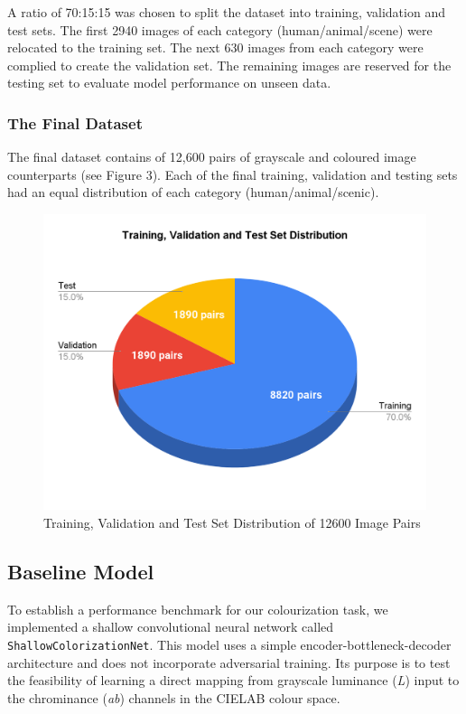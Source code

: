 \documentclass{article} %
\begin{document}
A ratio of 70:15:15 was chosen to split the dataset into training, validation and test sets. The first 2940 images of each category (human/animal/scene) were relocated to the training set. The next 630 images from each category were complied to create the validation set. The remaining images are reserved for the testing set to evaluate model performance on unseen data. 

\subsubsection{The Final Dataset}

The final dataset contains of 12,600 pairs of grayscale and coloured image counterparts (see Figure 3). Each of the final training, validation and testing sets had an equal distribution of each category (human/animal/scenic). 

\begin{figure}[htbp]            %
  \centering
  \includegraphics[width=0.7\linewidth]{Figs/dataset1.png}
  \caption{Training, Validation and Test Set Distribution of 12600 Image Pairs}
  \label{fig:dataset}
\end{figure}

\subsection{Baseline Model}

To establish a performance benchmark for our colourization task, we implemented a shallow convolutional neural network called \texttt{ShallowColorizationNet}. This model uses a simple 
encoder-bottleneck-decoder architecture and does not incorporate adversarial training. Its purpose is to test the feasibility of learning a direct mapping from grayscale luminance (\textit{L}) 
input to the chrominance (\textit{ab}) channels in the CIELAB colour space.
\end{document}
